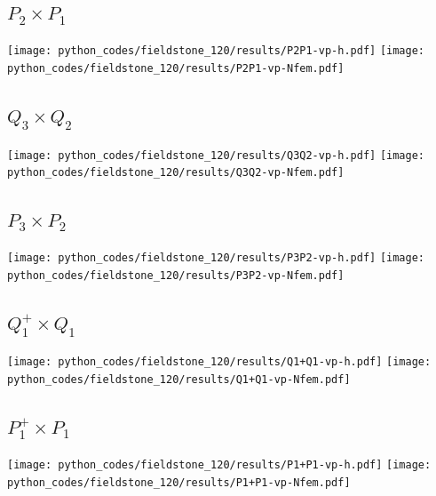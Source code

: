 \subsection*{$P_2\times P_1$}
\begin{center}
\texttt{[image: python\_codes/fieldstone\_120/results/P2P1-vp-h.pdf]}
\texttt{[image: python\_codes/fieldstone\_120/results/P2P1-vp-Nfem.pdf]}
\end{center}

\subsection*{$Q_3\times Q_2$}
\begin{center}
\texttt{[image: python\_codes/fieldstone\_120/results/Q3Q2-vp-h.pdf]}
\texttt{[image: python\_codes/fieldstone\_120/results/Q3Q2-vp-Nfem.pdf]}
\end{center}

\subsection*{$P_3\times P_2$}
\begin{center}
\texttt{[image: python\_codes/fieldstone\_120/results/P3P2-vp-h.pdf]}
\texttt{[image: python\_codes/fieldstone\_120/results/P3P2-vp-Nfem.pdf]}
\end{center}

\subsection*{$Q_1^+\times Q_1$}
\begin{center}
\texttt{[image: python\_codes/fieldstone\_120/results/Q1+Q1-vp-h.pdf]}
\texttt{[image: python\_codes/fieldstone\_120/results/Q1+Q1-vp-Nfem.pdf]}
\end{center}

\subsection*{$P_1^+\times P_1$}
\begin{center}
\texttt{[image: python\_codes/fieldstone\_120/results/P1+P1-vp-h.pdf]}
\texttt{[image: python\_codes/fieldstone\_120/results/P1+P1-vp-Nfem.pdf]}
\end{center}

